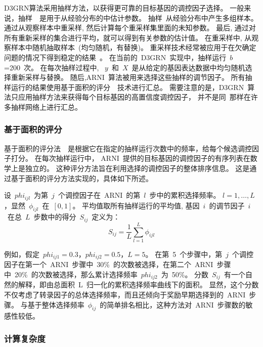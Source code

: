 D3GRN算法采用抽样方法，以获得更可靠的目标基因的调控因子选择。
一般来说，抽样~\cite{efron1994introduction}~是用于从经验分布的中估计参数。
抽样~\cite{efron1994introduction}从经验分布中产生多组样本。
通过从观察样本中重采样, 然后计算每个重采样集里面的未知参数。
最后, 通过对所有重新采样的集合进行平均，就可以得到有关参数的估计值。
在重采样中, 从观察样本中随机抽取样本~(均匀随机，有替换)。
重采样技术经常被应用于在欠确定问题的情况下得到稳定的结果~\cite{wang2011random}。
在当前的~D3GRN~实现中，抽样运行~$b$=200~次。
在每次抽样过程中, 
~$y$~和~$X$~是从给定的基因表达数据中均匀随机选择重新采样与替换。
随后,ARNI~算法被用来选择这些抽样的调节因子。
所有抽样运行的结果使用基于面积的评分~\cite{Haury2012}~技术进行汇总。
需要注意的是，D3GRN~算法只应用抽样方法来获得每个目标基因的高置信度调控因子，
并不是同~\cite{Haury2012}那样在许多抽样网络上进行汇总。


\subsubsection{基于面积的评分}
基于面积的评分法~\cite{singh2016blars}~是根据它在指定的抽样运行次数中的频率，给每个候选调控因子打分。
在每次抽样运行中， 
ARNI~提供的目标基因的调控因子的有序列表在数学上是独立的。
这种评分方法旨在利用选择的调控因子的整体排序信息。
这是通过基于面积的评分方法实现的，具体如下所述。

设~$phi_{ijl}$~为第~$j$~个调控因子在~ARNI~的第~$l$~步中的累积选择频率。
$l={1,\ldots,L}$，显然~$\phi_{ijl}$~在~$[0,1]$。
平均值取所有抽样运行的平均值, 
基因~$i$~的调节因子~$i$~在总~$L$~步数中的得分~$S_{ij}$~定义为：
\begin{equation}
\label{eq:scoring}
S_{ij} = \frac{1}{L} \sum_{l=1}^{L} \phi_{ijl}
\end{equation}

例如，假定~$phi_{ij1}=0.3$，$phi_{ij2}=0.5$，$L=5$。
在第~5~个步骤中，第~$j$~个调控因子在第一个~ARNI~步骤中~30\%~的次数被选择，在第二个~ARNI~步骤中~20\%~的次数被选择，那么累计选择频率~$phi_{ij2}$~为~50\%。
分数~$S_{ij}$~有一个自然的解释，即由总面积~L~归一化的累积选择频率曲线下的面积。
显然，这个分数不仅考虑了转录因子的总体选择频率，而且还倾向于奖励早期选择到的~ARNI~步骤。
与基于整体选择频率~$\phi_{ij}$~的简单排名相比，这种方法对~ARNI~步骤数的敏感性较低。

\subsubsection{计算复杂度}

